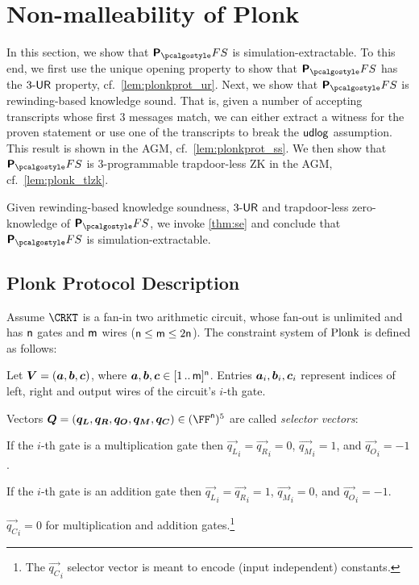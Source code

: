 
\section{Non-malleability of Plonk} 
\label{sec:plonk}
In this section, we show that $\plonkprotfs$ is simulation-extractable. To this end, we first use the unique opening property to show that
$\plonkprotfs$ has the ${3\text{-}\mathsf{UR}}$ property,
cf.~\cref{lem:plonkprot_ur}.
Next, we show that $\plonkprotfs$ is rewinding-based knowledge sound. That is, given a number of accepting transcripts whose first $3$ messages match, we can either extract a witness for the proven statement or use one of the transcripts to break the $\mathsf{udlog}$ assumption. This result is shown in the AGM, cf.~\cref{lem:plonkprot_ss}. We then show that $\plonkprotfs$ is $3$-programmable trapdoor-less ZK in the AGM, cf.~\cref{lem:plonk_tlzk}.

Given rewinding-based knowledge soundness, ${3\text{-}\mathsf{UR}}$ and trapdoor-less zero-knowledge of $\plonkprotfs$, we invoke \cref{thm:se} and conclude that $\plonkprotfs$ is simulation-extractable.

\newcommand{\vql}{\vec{q_{L}}}
\newcommand{\vqr}{\vec{q_{R}}}
\newcommand{\vqm}{\vec{q_{M}}}
\newcommand{\vqo}{\vec{q_{O}}}
\newcommand{\vx}{\vec{x}}
\newcommand{\vqc}{\vec{q_{C}}}

\subsection{Plonk Protocol Description}
\label{sec:plonk_explained}
Assume $\CRKT$ is a fan-in two arithmetic circuit, whose
fan-out is unlimited and has $\mathsf{n}$ gates and $\mathsf{m}$ wires
($\mathsf{n} \leq \mathsf{m} \leq 2\mathsf{n}$). The constraint
system of $\textnormal{{Plonk}}$ is defined as follows:
\begin{compactitem}
	\item Let $\vec{V} = (\va, \vb, \vc)$, where $\va, \vb, \vc
	\in \range{1}{\noofw}^\numberofconstrains$. Entries $\va_i, \vb_i, \vc_i$ represent indices of left,
	right and output wires of the circuit's $i$-th gate.
	\item Vectors $\vec{Q} = (\vql, \vqr, \vqo, \vqm, \vqc) \in
	(\FF^\numberofconstrains)^5$ are called \emph{selector vectors}:
	\begin{inparaenum}[(a)]
		\item If the $i$-th gate is a multiplication gate then $\vql_i = \vqr_i = 0$,
		$\vqm_i = 1$, and $\vqo_i = -1$. 
		\item If the $i$-th gate is an addition gate then $\vql_i = \vqr_i  = 1$, $\vqm_i =
		0$, and $\vqo_i = -1$. 
		\item $\vqc_i = 0$ for multiplication and addition gates.\footnote{The $\vqc_i$ selector vector is meant to encode (input independent) constants.} 
	\end{inparaenum}
\end{compactitem}

